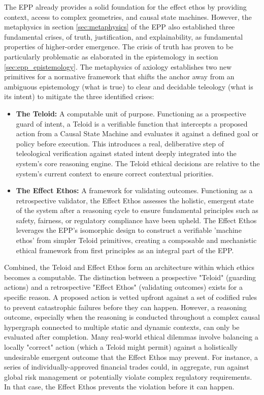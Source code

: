 The EPP already provides a solid foundation for the effect ethos by providing context, access to complex geometries, and causal state machines. However, the metaphysics in section \ref{sec:metaphysics} of the EPP also established three fundamental crises, of truth, justification, and explainability, as fundamental properties of higher-order emergence.  The crisis of truth has proven to be particularly problematic as elaborated in the epistemology in section \ref{sec:epp_epistemology}. The metaphysics of axiology establishes two new primitives for a normative framework that shifts the  anchor away from an ambiguous epistemology (what is true) to clear and decidable teleology (what is its intent) to mitigate the three identified crises:

\begin{itemize}
    \item \textbf{The Teloid:} A computable unit of purpose. Functioning as a prospective guard of intent, a Teloid is a verifiable function that intercepts a proposed action from a Causal State Machine and evaluates it against a defined
  goal or policy before execution. This introduces a real, deliberative step of teleological verification against stated
  intent deeply integrated into the system's core reasoning engine. The Teloid ethical decisions are relative to the system's current context to ensure correct contextual priorities. 
  
    \item \textbf{The Effect Ethos:}  A framework for validating outcomes. Functioning as a retrospective validator, the Effect Ethos assesses the holistic, emergent state of the system after a reasoning cycle to ensure fundamental principles such
  as safety, fairness, or regulatory compliance have been upheld. The Effect Ethos leverages the EPP's isomorphic
  design to construct a verifiable 'machine ethos' from simpler Teloid primitives, creating a composable and mechanistic
  ethical framework from first principles as an integral part of the EPP.
\end{itemize}


Combined, the Teloid and Effect Ethos form an architecture within which ethics becomes a computable. 
The distinction between a prospective "Teloid" (guarding actions) and a retrospective "Effect Ethos"
(validating outcomes) exists for a specific reason. A proposed action is vetted upfront against a set of codified rules to prevent catastrophic failures before they can happen. However, a reasoning outcome, especially when the reasoning is conducted throughout a complex causal hypergraph connected to multiple static and dynamic contexts, can only be evaluated after completion. Many real-world ethical dilemmas involve balancing a locally "correct" action (which a Teloid might permit) against a holistically undesirable emergent outcome that the Effect Ethos may prevent. For instance, a series of individually-approved financial trades could, in aggregate, run against global risk management or potentially violate complex regulatory requirements. In that case, the Effect Ethos prevents the violation before it can happen. 

